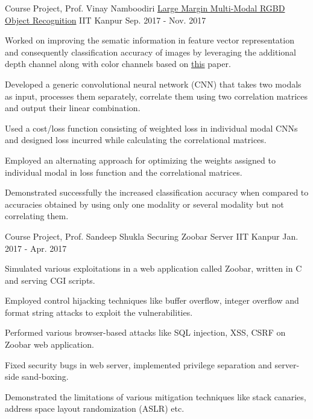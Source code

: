 \documentclass[11pt, a4paper]{cv}
\begin{document}
\begin{cventries}
  \cventry
    {Course Project, Prof. Vinay Namboodiri} %
        {\href{http://home.iitk.ac.in/~shivansh/resources/multimodal-rgbd.pdf}{Large Margin Multi-Modal RGBD Object Recognition}} %
    {IIT Kanpur} %
    {Sep. 2017 - Nov. 2017} %
    {
      \begin{cvitems} %
      \item {Worked on improving the sematic information in feature vector representation and consequently classification accuracy of images by leveraging the additional depth channel along with color channels based on \href{http://ieeexplore.ieee.org/iel7/6046/7302100/07258382.pdf}{this} paper.}
        \item {Developed a generic convolutional neural network (CNN) that takes two modals as input, processes them separately, correlate them using two correlation matrices and output their linear combination.}
        \item {Used a cost/loss function consisting of weighted loss in individual modal CNNs and designed loss incurred while calculating the correlational matrices.}
        \item {Employed an alternating approach for optimizing the weights assigned to individual modal in loss function and the correlational matrices.}
        \item {Demonstrated successfully the increased classification accuracy when compared to accuracies obtained by using only one modality or several modality but not correlating them.}
      \end{cvitems}
    }

  \cventry
    {Course Project, Prof. Sandeep Shukla} %
    {Securing Zoobar Server} %
    {IIT Kanpur} %
    {Jan. 2017 - Apr. 2017} %
    {
      \begin{cvitems} %
        \item {Simulated various exploitations in a web application called Zoobar, written in C and serving CGI scripts.}
        \item {Employed control hijacking techniques like buffer overflow, integer overflow and format string attacks to exploit the vulnerabilities.}
        \item {Performed various browser-based attacks like SQL injection, XSS, CSRF on Zoobar web application.}
        \item {Fixed security bugs in web server, implemented privilege separation and server-side sand-boxing.}
        \item {Demonstrated the limitations of various mitigation techniques like stack canaries, address space layout randomization (ASLR) etc.}
      \end{cvitems}
    }

\end{cventries}
\end{document}
